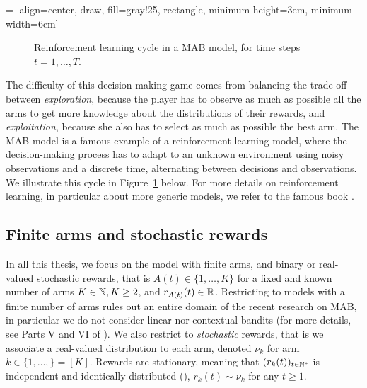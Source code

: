  = [align=center, draw, fill=gray!25, rectangle, minimum height=3em, minimum width=6em]
\begin{figure}[h!]
    \centering
\caption{Reinforcement learning cycle in a MAB model, for time steps $t=1,\dots,T$.}
\label{fig:2:ReinforcementLearningCycleMABmodel}
\end{figure}


The difficulty of this decision-making game comes from balancing the trade-off between \emph{exploration}, because the player has to observe as much as possible all the arms to get more knowledge about the distributions of their rewards, and \emph{exploitation}, because she also has to select as much as possible the best arm.
The MAB model is a famous example of a reinforcement learning model, where the decision-making process has to adapt to an unknown environment using noisy observations and a discrete time, alternating between decisions and observations.
We illustrate this cycle in Figure~\ref{fig:2:ReinforcementLearningCycleMABmodel} below.
For more details on reinforcement learning, in particular about more generic models, we refer to the famous book \cite{SuttonBarto2018}.


\subsection{Finite arms and stochastic rewards}


In all this thesis, we focus on the model with finite arms, and binary or real-valued stochastic rewards, that is $A(t)\in\{1,\dots,K\}$ for a fixed and known number of arms $K\in\mathbb{N},K\geq2$, and $r_{A(t)}(t)\in\mathbb{R}$.
%
Restricting to models with a finite number of arms
rules out an entire domain of the recent research on MAB, in particular we do not consider linear nor contextual bandits (for more details, see Parts V and VI of \cite{LattimoreBanditAlgorithmsBook}).
%
We also restrict to \emph{stochastic} rewards, that is we associate a real-valued distribution to each arm, denoted $\nu_k$ for arm $k\in\{1,\dots,\}=[K]$.
Rewards are stationary, meaning that $(r_k(t))_{t\in\mathbb{N}^*}$ is independent and identically distributed (\iid), $r_k(t) \sim \nu_k$ for any $t\geq1$.


